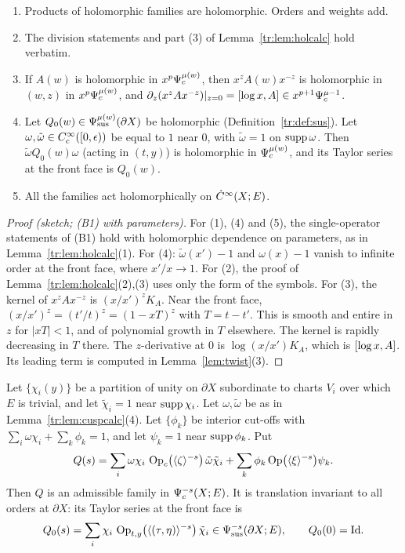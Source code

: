 \begin{lemma}\label{tr:lem:cuspcalc}
\begin{enumerate}
\item Products of holomorphic families are holomorphic. Orders and weights
add.
\item The division statements and part (3) of Lemma~\ref{tr:lem:holcalc}
hold verbatim.
\item If \(A(w)\) is holomorphic in \(x^p\Psi_{c}^{\mu(w)}\), then
\(x^zA(w)x^{-z}\) is holomorphic in \((w,z)\) in \(x^p\Psi_{c}^{\mu(w)}\), and
\(\partial_z(x^zAx^{-z})|_{z=0}=[\log x,A]\in x^{p+1}\Psi_{c}^{\mu-1}\).
\item Let \(Q_0(w)\in\Psi_{\mathrm{sus}}^{\mu(w)}(\partial X)\) be holomorphic
(Definition~\ref{tr:def:sus}). Let \(\omega,\tilde\omega\in
C^\infty_c([0,\epsilon))\) be equal to \(1\) near \(0\), with \(\tilde\omega=1\)
on \(\operatorname{supp}\omega\). Then \(\tilde\omega Q_0(w)\omega\) (acting in \((t,y)\))
is holomorphic in \(\Psi_{c}^{\mu(w)}\), and its Taylor series at the front
face is \(Q_0(w)\).
\item All the families act holomorphically on \(\dot C^\infty(X;E)\).
\end{enumerate}
\end{lemma}

\begin{proof}[Proof (sketch; (B1) with parameters)]
For (1), (4) and (5), the single-operator statements of (B1) hold with
holomorphic dependence on parameters, as in Lemma~\ref{tr:lem:holcalc}(1).
For (4): \(\tilde\omega(x')-1\) and \(\omega(x)-1\) vanish to infinite order
at the front face, where \(x'/x\to1\). For (2), the proof of
Lemma~\ref{tr:lem:holcalc}(2),(3) uses only the form of the symbols. For (3),
the kernel of \(x^zAx^{-z}\) is \((x/x')^zK_A\). Near the front face,
\((x/x')^z=(t'/t)^z=(1-xT)^z\) with \(T=t-t'\). This is smooth and entire
in \(z\) for \(|xT|<1\), and of polynomial growth in \(T\) elsewhere. The
kernel is rapidly decreasing in \(T\) there. The \(z\)-derivative at \(0\)
is \(\log(x/x')K_A\), which is \([\log x,A]\). Its leading term is computed in
Lemma~\ref{lem:twist}(3).
\end{proof}

\begin{proposition}\label{tr:prop:Q}
Let \(\{\chi_i(y)\}\) be a partition of unity on \(\partial X\) subordinate
to charts \(V_i\) over which \(E\) is trivial, and let \(\tilde\chi_i=1\)
near \(\operatorname{supp}\chi_i\). Let \(\omega,\tilde\omega\) be as in
Lemma~\ref{tr:lem:cuspcalc}(4). Let \(\{\phi_k\}\) be interior cut-offs
with \(\sum_i\omega\chi_i+\sum_k\phi_k=1\), and let \(\psi_k=1\) near
\(\operatorname{supp}\phi_k\). Put
\[
 Q(s)=\sum_i\omega\chi_i\,\operatorname{Op}_c\bigl(\langle \zeta\rangle^{-s}\bigr)\,
 \tilde\omega\tilde\chi_i+\sum_k\phi_k\operatorname{Op}\bigl(\langle \xi\rangle^{-s}\bigr)\psi_k .
\]
Then \(Q\) is an admissible family in \(\Psi_{c}^{-s}(X;E)\). It is
translation invariant to all orders at \(\partial X\): its Taylor series at
the front face is
\[
 Q_0(s)=\sum_i\chi_i\,\operatorname{Op}_{t,y}\bigl(\langle (\tau,\eta)\rangle^{-s}\bigr)\,
 \tilde\chi_i\in\Psi_{\mathrm{sus}}^{-s}(\partial X;E),\qquad Q_0(0)=\mathrm{Id}.
\]
\end{proposition}


